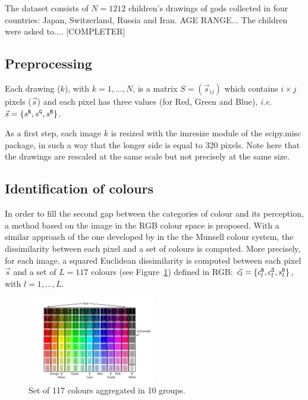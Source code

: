 \documentclass[11pt,a4paper]{article}
\begin{document}
The dataset consists of $N = 1212$ children's drawings of gods collected in four countries: Japan, Switzerland, Russia and Iran. AGE RANGE... The children were asked to.... [COMPLETER]


\subsection{Preprocessing}
Each drawing ($k$), with $k = 1,\dots, N$, is a matrix $S = (\vec{s}_{ij})$ which contains $i \times j$
pixels ($\vec{s}$) and each pixel has three values (for Red, Green and Blue), \textit{i.e.}
$\vec{s} = \{ s^{\tt \scriptstyle R}, s^{\tt \scriptstyle G}, s^{\tt \scriptstyle B} \}$.

As a first step, each image $k$ is resized with the imresize
module of the scipy.misc package, in such a way that the longer side is
equal to 320 pixels. Note here that the drawings are
rescaled at the same scale but not precisely at the same size.


\subsection{Identification of colours}
\label{sec:identification}




In order to fill the second gap between the categories of colour and its
perception, a method based on the image in the RGB colour space is
proposed. With a similar approach of the one developed by
\cite{kimbaelee2007} in the the Munsell colour system, the dissimilarity
between each pixel and a set of colours is computed. More precisely, for
each image, a squared Euclidean dissimilarity is computed between each
pixel \(\vec{s}\) and a set of $L = 117$ colours (see Figure~\ref{colour_set}) defined in RGB:
\(\vec{c_l} = \{ c^{\tt \scriptstyle R}_{l}, c^{\tt \scriptstyle G}_{l}, s^{\tt \scriptstyle B}_{l} \}\),
with $l = 1, ..., L$.

\begin{figure}
	\centering
	\includegraphics[width=0.5\textwidth]{figures/Col_tab.pdf}
	\caption{Set of 117 colours aggregated in 10 groups. \label{colour_set}}
\end{figure}
\end{document}
